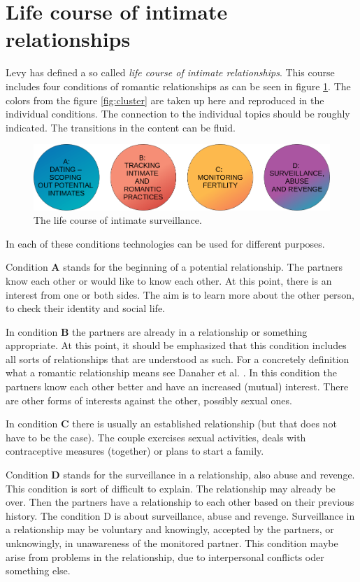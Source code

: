 \section{Life course of intimate relationships}
\label{sec:life_course}
Levy \cite{levy2014intimate} has defined a so called \textit{life course of intimate relationships}. This course includes four conditions of romantic relationships as can be seen in figure \ref{fig:live_course}. The colors from the figure \ref{fig:cluster} are taken up here and reproduced in the individual conditions. The connection to the individual topics should be roughly indicated. The transitions in the content can be fluid.
\begin{figure}[htb]
    \centering
	\includegraphics[width=\linewidth]{img/life_course.png}
	\caption{The life course of intimate surveillance.}
	\label{fig:live_course}
\end{figure}

In each of these conditions technologies can be used for different purposes.

Condition \textbf{A} stands for the beginning of a potential relationship. The partners know each other or would like to know each other. At this point, there is an interest from one or both sides. The aim is to learn more about the other person, to check their identity and social life.

In condition \textbf{B} the partners are already in a relationship or something appropriate. At this point, it should be emphasized that this condition includes all sorts of relationships that are understood as such. For a concretely definition what a romantic relationship means see Danaher et al. \cite{doi:10.1080/15265161.2017.1409823}. In this condition the partners know each other better and have an increased (mutual) interest. There are other forms of interests against the other, possibly sexual ones.

In condition \textbf{C} there is usually an established relationship (but that does not have to be the case). The couple exercises sexual activities, deals with contraceptive measures (together) or plans to start a family.

Condition \textbf{D} stands for the surveillance in a relationship, also abuse and revenge. This condition is sort of difficult to explain. 
The relationship may already be over. Then the partners have a relationship to each other based on their previous history. The condition D is about surveillance, abuse and revenge. Surveillance in a relationship may be voluntary and knowingly, accepted by the partners, or unknowingly, in unawareness of the monitored partner.
This condition maybe arise from problems in the relationship, due to interpersonal conflicts oder something else.

